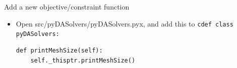 \documentclass{bredelebeamer}
\begin{document}
\begin{frame}[fragile]{Add a new objective/constraint function}

\begin{itemize}
  \item Open src/pyDASolvers/pyDASolvers.pyx,  and add this to \texttt{cdef class pyDASolvers:}
 \begin{lstlisting}
def printMeshSize(self):
    self._thisptr.printMeshSize()
 \end{lstlisting}
\end{itemize}

\end{frame}
\end{document}
